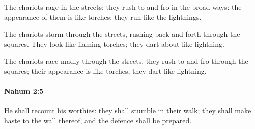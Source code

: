 			\begin{versebox}
					\item[BHS] 
					\item[LXX] 
					\item[ASV] The chariots rage in the streets; they rush to and fro in the broad ways: the appearance of them is like torches; they run like the lightnings.
					\item[NIV] The chariots storm through the streets, rushing back and forth through the squares. They look like flaming torches; they dart about like lightning.
					\item[NRSV] The chariots race madly through the streets, they rush to and fro through the squares; their appearance is like torches, they dart like lightning.
			\end{versebox}

		\paragraph{Nahum 2:5} %
			\label{NAHUM-2-5}

			He shall recount his worthies: they shall stumble in their walk; they shall make haste to the wall thereof, and the defence shall be prepared.


